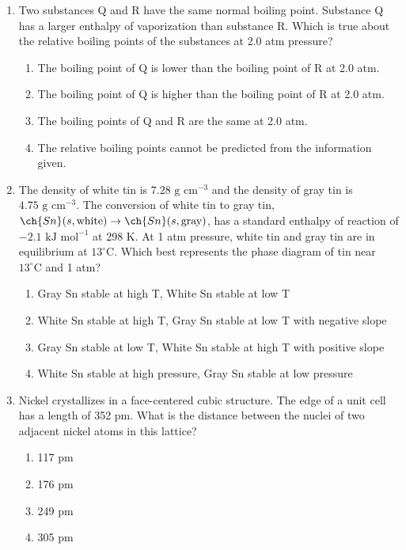 \documentclass[twocolumn,10pt]{article}
\begin{document}
\begin{enumerate}[label=\arabic*., leftmargin=*]
\item Two substances Q and R have the same normal boiling point. Substance Q has a larger enthalpy of vaporization than substance R. Which is true about the relative boiling points of the substances at 2.0 atm pressure?
\begin{enumerate}[label=(\Alph*)]
    \item The boiling point of Q is lower than the boiling point of R at 2.0 atm.
    \item The boiling point of Q is higher than the boiling point of R at 2.0 atm.
    \item The boiling points of Q and R are the same at 2.0 atm.
    \item The relative boiling points cannot be predicted from the information given.
\end{enumerate}

\item The density of white tin is $7.28\text{ g cm}^{-3}$ and the density of gray tin is $4.75\text{ g cm}^{-3}$. The conversion of white tin to gray tin, $\ch{Sn}(s, \text{white}) \rightarrow \ch{Sn}(s, \text{gray})$, has a standard enthalpy of reaction of $-2.1\text{ kJ mol}^{-1}$ at 298 K. At 1 atm pressure, white tin and gray tin are in equilibrium at $13^\circ\text{C}$. Which best represents the phase diagram of tin near $13^\circ\text{C}$ and 1 atm?
\begin{enumerate}[label=(\Alph*)]
    \item Gray Sn stable at high T, White Sn stable at low T
    \item White Sn stable at high T, Gray Sn stable at low T with negative slope
    \item Gray Sn stable at low T, White Sn stable at high T with positive slope
    \item White Sn stable at high pressure, Gray Sn stable at low pressure
\end{enumerate}

\item Nickel crystallizes in a face-centered cubic structure. The edge of a unit cell has a length of 352 pm. What is the distance between the nuclei of two adjacent nickel atoms in this lattice?
\begin{enumerate}[label=(\Alph*)]
    \item 117 pm \item 176 pm \item 249 pm \item 305 pm
\end{enumerate}


\end{enumerate}
\end{document}
